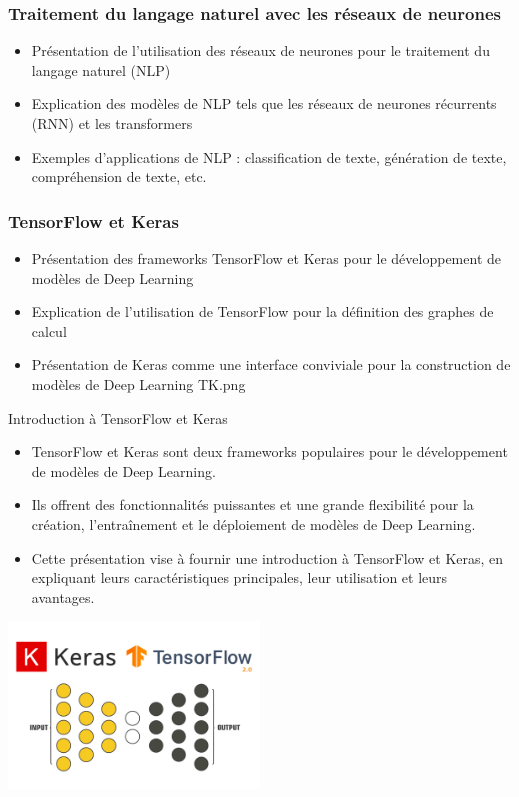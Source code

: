 \documentclass{beamer}
\begin{document}
\begin{frame}
	\frametitle{Traitement du langage naturel avec les réseaux de neurones}
	\begin{itemize}
		\item Présentation de l'utilisation des réseaux de neurones pour le traitement du langage naturel (NLP)
		\item Explication des modèles de NLP tels que les réseaux de neurones récurrents (RNN) et les transformers
		\item Exemples d'applications de NLP : classification de texte, génération de texte, compréhension de texte, etc.
	\end{itemize}
\end{frame}


\begin{frame}
	\frametitle{TensorFlow et Keras}
	\begin{itemize}
		\item Présentation des frameworks TensorFlow et Keras pour le développement de modèles de Deep Learning
		\item Explication de l'utilisation de TensorFlow pour la définition des graphes de calcul
		\item Présentation de Keras comme une interface conviviale pour la construction de modèles de Deep Learning
		TK.png
	\end{itemize}
\end{frame}

\begin{frame}{Introduction à TensorFlow et Keras}
	\begin{itemize}
		\item TensorFlow et Keras sont deux frameworks populaires pour le développement de modèles de Deep Learning.
		\item Ils offrent des fonctionnalités puissantes et une grande flexibilité pour la création, l'entraînement et le déploiement de modèles de Deep Learning.
		\item Cette présentation vise à fournir une introduction à TensorFlow et Keras, en expliquant leurs caractéristiques principales, leur utilisation et leurs avantages.
	\end{itemize}
	\centering
\includegraphics[width=0.5\textwidth]{TK.png}

\end{frame}
\end{document}
